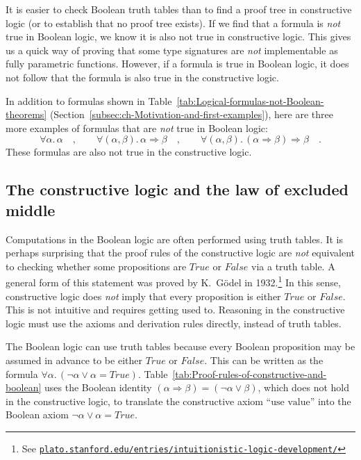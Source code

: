 It is easier to check Boolean truth tables than to find a proof tree
in constructive logic (or to establish that no proof tree exists).
If we find that a formula is \emph{not} true in Boolean logic, we
know it is also not true in constructive logic. This gives us a quick
way of proving that some type signatures are \emph{not} implementable
as fully parametric functions. However, if a formula is true in Boolean
logic, it does not follow that the formula is also true in the constructive
logic.

In addition to formulas shown in Table~\ref{tab:Logical-formulas-not-Boolean-theorems}
(Section~\ref{subsec:ch-Motivation-and-first-examples}), here are
three more examples of formulas that are \emph{not} true in Boolean
logic:
\[
\forall\alpha.\,\alpha\quad,\quad\quad\forall(\alpha,\beta).\,\alpha\Rightarrow\beta\quad,\quad\quad\forall(\alpha,\beta).\,(\alpha\Rightarrow\beta)\Rightarrow\beta\quad.
\]
These formulas are also not true in the constructive logic.

\subsection{The constructive logic and the law of excluded middle}

Computations in the Boolean logic are often performed using truth
tables. It is perhaps surprising that the proof rules of the constructive
logic are \emph{not} equivalent to checking whether some propositions
are $True$ or $False$ via a truth table. A general form of this
statement was proved by K.~G\"odel in
1932.\footnote{See \texttt{\href{https://plato.stanford.edu/entries/intuitionistic-logic-development/\#SomeEarlResu}{plato.stanford.edu/entries/intuitionistic-logic-development/}}}
In this sense, constructive logic does \emph{not} imply that every
proposition is either $True$ or $False$. This is not intuitive and
requires getting used to. Reasoning in the constructive logic must
use the axioms and derivation rules directly, instead of truth tables.

The Boolean logic can use truth tables because every Boolean proposition
may be assumed in advance to be either $True$ or $False$. This can
be written as the formula $\forall\alpha.\,(\neg\alpha\vee\alpha=True)$.
Table~\ref{tab:Proof-rules-of-constructive-and-boolean} uses the
Boolean identity $\left(\alpha\Rightarrow\beta\right)=(\neg\alpha\vee\beta)$,
which does not hold in the constructive logic, to translate the constructive
axiom \textsf{``}$\text{use value}$\textsf{''} into the Boolean axiom $\neg\alpha\vee\alpha=True$. 

